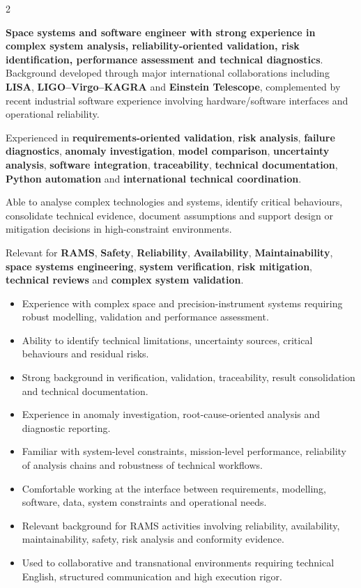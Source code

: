 \documentclass[8pt,a4paper,ragged2e,withhyper]{altacv}
\begin{document}
\begin{paracol}{2}
\switchcolumn


\textbf{Space systems and software engineer with strong experience in complex system analysis, reliability-oriented validation, risk identification, performance assessment and technical diagnostics}. Background developed through major international collaborations including \textbf{LISA}, \textbf{LIGO--Virgo--KAGRA} and \textbf{Einstein Telescope}, complemented by recent industrial software experience involving hardware/software interfaces and operational reliability.

Experienced in \textbf{requirements-oriented validation}, \textbf{risk analysis}, \textbf{failure diagnostics}, \textbf{anomaly investigation}, \textbf{model comparison}, \textbf{uncertainty analysis}, \textbf{software integration}, \textbf{traceability}, \textbf{technical documentation}, \textbf{Python automation} and \textbf{international technical coordination}.

Able to analyse complex technologies and systems, identify critical behaviours, consolidate technical evidence, document assumptions and support design or mitigation decisions in high-constraint environments.

Relevant for \textbf{RAMS}, \textbf{Safety}, \textbf{Reliability}, \textbf{Availability}, \textbf{Maintainability}, \textbf{space systems engineering}, \textbf{system verification}, \textbf{risk mitigation}, \textbf{technical reviews} and \textbf{complex system validation}.


\begin{itemize}
  \item Experience with complex space and precision-instrument systems requiring robust modelling, validation and performance assessment.
  \item Ability to identify technical limitations, uncertainty sources, critical behaviours and residual risks.
  \item Strong background in verification, validation, traceability, result consolidation and technical documentation.
  \item Experience in anomaly investigation, root-cause-oriented analysis and diagnostic reporting.
  \item Familiar with system-level constraints, mission-level performance, reliability of analysis chains and robustness of technical workflows.
  \item Comfortable working at the interface between requirements, modelling, software, data, system constraints and operational needs.
  \item Relevant background for RAMS activities involving reliability, availability, maintainability, safety, risk analysis and conformity evidence.
  \item Used to collaborative and transnational environments requiring technical English, structured communication and high execution rigor.
\end{itemize}


\end{paracol}
\end{document}
